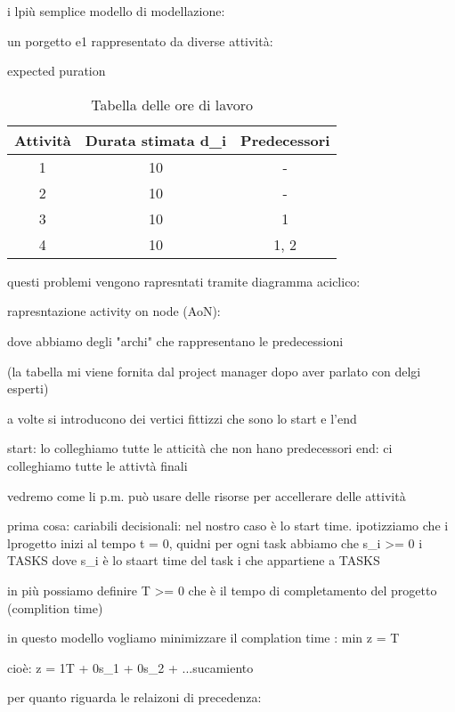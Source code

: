 i lpiù semplice modello di modellazione:

un porgetto e1 rappresentato da diverse attività:

expected puration




\begin{table}[h!]
	\begin{center}
	\begin{tabular}{|c | c c |} 
			\hline
			Attività & Durata stimata d_i & Predecessori \\ [0.5ex]
			\hline
 			1 & 10 & - \\
			2 & 10 & - \\
			3 & 10 & 1 \\
			4 & 10 & 1, 2 \\
			\hline
		\end{tabular}
	\end{center}
	\caption{Tabella delle ore di lavoro}
	\label{taborelav}
\end{table}


questi problemi vengono rapresntati tramite diagramma aciclico:

rapresntazione activity on node (AoN):

dove abbiamo degli "archi" che rappresentano le predecessioni 

(la tabella mi viene fornita dal project manager dopo aver parlato con delgi esperti)



a volte si introducono dei vertici fittizzi che sono lo start e l'end

start: lo colleghiamo tutte le atticità che non hano predecessori
end: ci colleghiamo tutte le attivtà finali




vedremo come li p.m. può usare delle risorse per accellerare delle attività


prima cosa: cariabili decisionali: nel nostro caso è lo start time. ipotizziamo che i lprogetto inizi al tempo t = 0, quidni per ogni task abbiamo che s_i >= 0 \forall i \in TASKS dove s_i è lo staart time del task i che appartiene a TASKS

in più possiamo definire T >= 0 che è il tempo di completamento del progetto (complition time)


in questo modello vogliamo minimizzare il complation time : min z = T

cioè: z = 1T + 0s_1 + 0s_2 + ...sucamiento


per quanto riguarda le relaizoni di precedenza:

